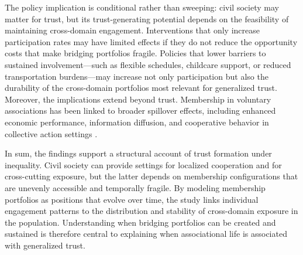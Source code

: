 The policy implication is conditional rather than sweeping: civil society may matter for trust, but its trust-generating potential depends on the feasibility of maintaining cross-domain engagement. Interventions that only increase participation rates may have limited effects if they do not reduce the opportunity costs that make bridging portfolios fragile. Policies that lower barriers to sustained involvement—such as flexible schedules, childcare support, or reduced transportation burdens—may increase not only participation but also the durability of the cross-domain portfolios most relevant for generalized trust. Moreover, the implications extend beyond trust. Membership in voluntary associations has been linked to broader spillover effects, including enhanced economic performance, information diffusion, and cooperative behavior in collective action settings \parencite{audia_effect_2010}.

In sum, the findings support a structural account of trust formation under inequality. Civil society can provide settings for localized cooperation and for cross-cutting exposure, but the latter depends on membership configurations that are unevenly accessible and temporally fragile. By modeling membership portfolios as positions that evolve over time, the study links individual engagement patterns to the distribution and stability of cross-domain exposure in the population. Understanding when bridging portfolios can be created and sustained is therefore central to explaining when associational life is associated with generalized trust.

\printbibliography

